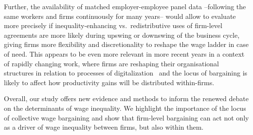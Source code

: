 \documentclass[Review,times,sageh,11pt]{sagej}
\begin{document}
Further, the availability of matched employer-employee panel data --following the same workers and firms continuously for many years-- would allow to evaluate more precisely if inequality-enhancing vs.~redistributive uses of firm-level agreements are more likely during upswing or downswing of the business cycle, giving firms more flexibility and discretionality to reshape the wage ladder in case of need. This appears to be even more relevant in more recent years in a context of rapidly changing work, where firms are reshaping their organisational structures in relation to processes of digitalization~\citep{OECD2019} and the locus of bargaining is likely to affect how productivity gains will be distributed within-firms.

Overall, our study offers new evidence and methods to inform the renewed debate on the determinants of wage inequality. We highlight the importance of the locus of collective wage bargaining and show that firm-level bargaining can act not only as a driver of wage inequality between firms, but also within them.

\clearpage
\theendnotes
\end{document}
